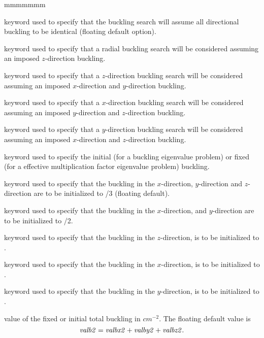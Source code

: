 \begin{ListeDeDescription}{mmmmmmm}
\item[\moc{G}] keyword used to specify that the buckling search will assume
all directional buckling to be identical (floating default option).

\item[\moc{R}] keyword used to specify that a radial buckling search will be
considered assuming an imposed $z$-direction buckling.

\item[\moc{Z}] keyword used to specify that a $z$-direction buckling search
will be considered  assuming an imposed $x$-direction and $y$-direction
buckling.

\item[\moc{X}] keyword used to specify that a $x$-direction buckling search
will be considered  assuming an imposed $y$-direction and $z$-direction
buckling.

\item[\moc{Y}] keyword used to specify that a $y$-direction buckling search
will be considered  assuming an imposed $x$-direction and $z$-direction
buckling.

\item[\moc{BUCK}] keyword used to specify the initial (for a buckling
eigenvalue problem) or fixed (for a effective multiplication factor eigenvalue
problem) buckling. 

\item[\moc{G}] keyword used to specify that the buckling in the $x$-direction,
$y$-direction and $z$-direction are to be initialized to /3
(floating default).

\item[\moc{R}] keyword used to specify that the buckling in the $x$-direction,
and $y$-direction are to be initialized to /2.

\item[\moc{Z}] keyword used to specify that the buckling in the $z$-direction,
is to be initialized to .

\item[\moc{X}] keyword used to specify that the buckling in the $x$-direction,
is to be initialized to .

\item[\moc{Y}] keyword used to specify that the buckling in the $y$-direction,
is to be initialized to .

\item[\dusa{valb2}] value of the fixed or initial total buckling in $cm^{-2}$.
The floating default value is
$${\it valb2}={\it valbx2}+{\it valby2}+{\it valbz2}.$$


\end{ListeDeDescription}
